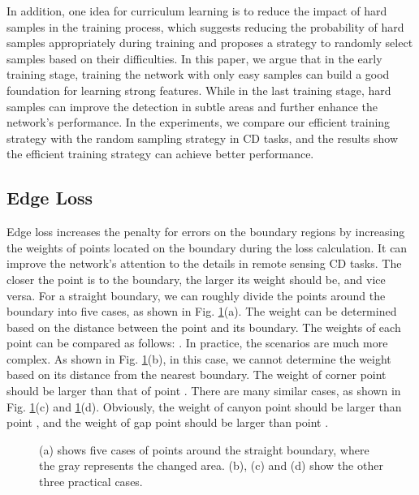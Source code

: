 \documentclass[lettersize,journal]{IEEEtran}
\begin{document}
In addition, one idea for curriculum learning is to reduce the impact of hard samples in the training process, which suggests reducing the probability of hard samples appropriately during training and proposes a strategy to randomly select samples based on their difficulties.
In this paper, we argue that in the early training stage, training the network with only easy samples can build a good foundation for learning strong features.
While in the last training stage, hard samples can improve the detection in subtle areas and further enhance the network's performance.
In the experiments, we compare our efficient training strategy with the random sampling strategy in CD tasks, and the results show the efficient training strategy can achieve better performance.





\subsection{Edge Loss}

Edge loss increases the penalty for errors on the boundary regions by increasing the weights of points located on the boundary during the loss calculation.
It can improve the network's attention to the details in remote sensing CD tasks.
The closer the point is to the boundary, the larger its weight should be, and vice versa.
For a straight boundary, we can roughly divide the points around the boundary into five cases, as shown in Fig. \ref{boundary}(a).
The weight can be determined based on the distance between the point and its boundary.
The weights of each point  can be compared as follows: .
In practice, the scenarios are much more complex.
As shown in Fig. \ref{boundary}(b), in this case, we cannot determine the weight based on its distance from the nearest boundary.
The weight of corner point  should be larger than that of point .
There are many similar cases, as shown in Fig. \ref{boundary}(c) and \ref{boundary}(d).
Obviously, the weight of canyon point  should be larger than point ,
and the weight of gap point  should be larger than point .


\begin{figure}[ht]
\centering
{}

\caption{(a) shows five cases of points around the straight boundary, where the gray represents the changed area.
(b), (c) and (d) show the other three practical cases.}
\label{boundary}
\end{figure}
\end{document}
